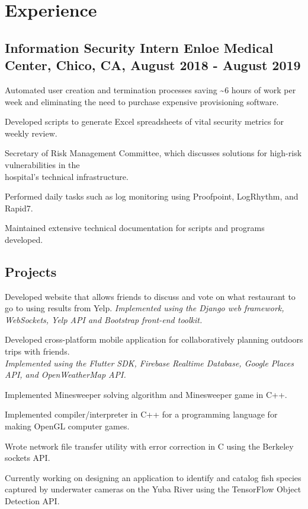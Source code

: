 \documentclass[letterpaper]{article}
\renewenvironment{itemize}{
  \begin{list}{}{
    \setlength{\leftmargin}{1.5em}
  }
}{
  \end{list}
}
\begin{document}
\section*{Experience}
\subsection*{Information Security Intern Enloe Medical Center, Chico, CA, August 2018 - August 2019
}
\begin{itemize}
    \item[$\bullet$] Automated user creation and termination processes saving \textasciitilde 6 hours of work per week and eliminating the need to purchase expensive provisioning software.
 \item[$\bullet$] Developed scripts to generate Excel spreadsheets of vital security metrics for weekly review.
 \item[$\bullet$] Secretary of Risk Management Committee, which discusses solutions for high-risk vulnerabilities in the\\hospital's technical infrastructure.
 \item[$\bullet$] Performed daily tasks such as log monitoring using Proofpoint, LogRhythm, and Rapid7.
 \item[$\bullet$] Maintained extensive technical documentation for scripts and programs developed.
\end{itemize}
\subsection*{Projects}
\begin{itemize}
    \item[$\bullet$] Developed website that allows friends to discuss and vote on what restaurant to go to using results from Yelp. \emph{Implemented using the Django web framework, WebSockets, Yelp API and Bootstrap front-end toolkit.}
    \item[$\bullet$] Developed cross-platform mobile application for collaboratively planning outdoors trips with friends.\\\emph{Implemented using the Flutter SDK, Firebase Realtime Database, Google Places API, and OpenWeatherMap API.}
    \item[$\bullet$] Implemented Minesweeper solving algorithm and Minesweeper game in C++.
    \item[$\bullet$] Implemented compiler/interpreter in C++ for a programming language for making OpenGL computer games.
    \item[$\bullet$] Wrote network file transfer utility with error correction in C using the Berkeley sockets API.
    \item[$\bullet$] Currently working on designing an application to identify and catalog fish species captured by underwater cameras on the Yuba River using the TensorFlow Object Detection API.
\end{itemize}
\end{document}
